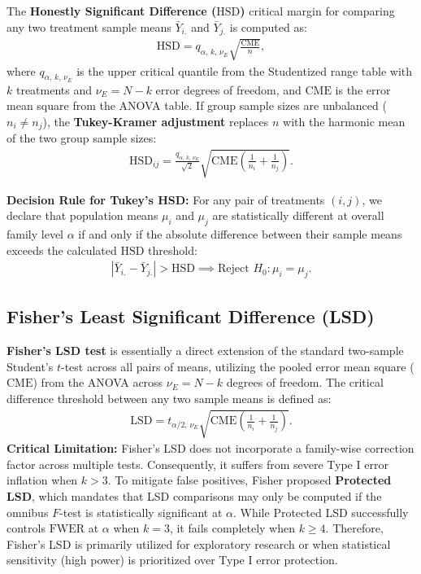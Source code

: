 The \textbf{Honestly Significant Difference ($\text{HSD}$)} critical margin for comparing any two treatment sample means $\bar{Y}_{i.}$ and $\bar{Y}_{j.}$ is computed as:
\begin{align}
	\text{HSD} = q_{\alpha, \, k, \, \nu_E} \sqrt{\frac{\text{CME}}{n}},
\end{align}
where $q_{\alpha, \, k, \, \nu_E}$ is the upper critical quantile from the Studentized range table with $k$ treatments and $\nu_E = N - k$ error degrees of freedom, and $\text{CME}$ is the error mean square from the ANOVA table. If group sample sizes are unbalanced ($n_i \neq n_j$), the \textbf{Tukey-Kramer adjustment} replaces $n$ with the harmonic mean of the two group sample sizes:
\begin{align}
	\text{HSD}_{ij} = \frac{q_{\alpha, \, k, \, \nu_E}}{\sqrt{2}} \sqrt{\text{CME} \left( \frac{1}{n_i} + \frac{1}{n_j} \right)}.
\end{align}

\textbf{Decision Rule for Tukey's HSD:} For any pair of treatments $(i, j)$, we declare that population means $\mu_i$ and $\mu_j$ are statistically different at overall family level $\alpha$ if and only if the absolute difference between their sample means exceeds the calculated $\text{HSD}$ threshold:
\begin{align}
	|\bar{Y}_{i.} - \bar{Y}_{j.}| > \text{HSD} \implies \text{Reject } H_0: \mu_i = \mu_j.
\end{align}

\subsection{Fisher's Least Significant Difference (LSD)}
\textbf{Fisher's LSD test} is essentially a direct extension of the standard two-sample Student's $t$-test across all pairs of means, utilizing the pooled error mean square ($\text{CME}$) from the ANOVA across $\nu_E = N - k$ degrees of freedom. The critical difference threshold between any two sample means is defined as:
\begin{align}
	\text{LSD} = t_{\alpha/2, \, \nu_E} \sqrt{\text{CME} \left( \frac{1}{n_i} + \frac{1}{n_j} \right)}.
\end{align}
\textbf{Critical Limitation:} Fisher's LSD does not incorporate a family-wise correction factor across multiple tests. Consequently, it suffers from severe Type I error inflation when $k > 3$. To mitigate false positives, Fisher proposed \textbf{Protected LSD}, which mandates that LSD comparisons may only be computed if the omnibus $F$-test is statistically significant at $\alpha$. While Protected LSD successfully controls $\text{FWER}$ at $\alpha$ when $k=3$, it fails completely when $k \geq 4$. Therefore, Fisher's LSD is primarily utilized for exploratory research or when statistical sensitivity (high power) is prioritized over Type I error protection.

